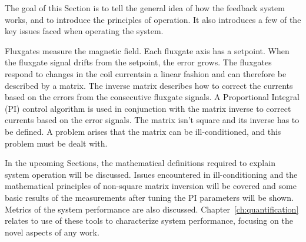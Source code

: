 
The goal of this Section is to tell the general idea of how the feedback system works, and to introduce the principles of operation.  It also introduces a few of the key issues faced when operating the system. 

Fluxgates measure the magnetic field. Each fluxgate axis has a setpoint. When the fluxgate signal drifts from the setpoint, the error grows. The fluxgates respond to changes in the coil currentsin a linear fashion and can therefore be described by a matrix. The inverse matrix describes how to correct the currents based on the errors from the consecutive fluxgate signals. A Proportional Integral (PI) control algorithm  is used in conjunction with the matrix inverse to correct currents based on the error signals. The matrix isn't square and its inverse has to be defined. A problem arises that the matrix can be ill-conditioned, and this problem must be dealt with. 

In the upcoming Sections, the mathematical definitions required to explain system operation will be discussed. Issues encountered in ill-conditioning and the mathematical principles of non-square matrix inversion will be covered and some basic results of the measurements after tuning the PI parameters will be shown. Metrics of the system performance are also discussed. Chapter~\ref{ch:quantification} relates to use of these tools to characterize system performance, focusing on the novel aspects of any work.

